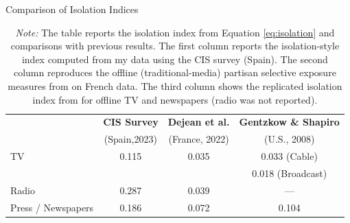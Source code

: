 \documentclass[12pt]{article}
\begin{document}
	
	\begin{table}[H]
		\caption{Comparison of Isolation Indices}
		\label{tab:isolation_table_compare}
		\centering
		\begin{tabular}{lccc}
			\hline
 & \textbf{CIS Survey} & \textbf{Dejean et al.} & \textbf{Gentzkow \& Shapiro} \\
			&  (Spain,2023) & (France, 2022) &  (U.S., 2008) \\
			\hline
			TV & 0.115 & 0.035 & 0.033 \scriptsize{(Cable)}\\
						 &  &  & \hspace{0.45cm} 0.018 \scriptsize{(Broadcast)} \\
			Radio & 0.287 & 0.039 & — \\
			Press / Newspapers & 0.186 & 0.072 & 0.104\\
			\hline
		\end{tabular}
			\caption*{\small  \textit{Note:} The table reports the isolation index from Equation \eqref{eq:isolation} and comparisons with previous results. 
				The first column reports the isolation-style index computed from my data using the CIS survey (Spain).
				The second column reproduces the offline (traditional-media) partisan selective exposure measures from \cite{Dejean2022PartisanSE} on French data. 
				The third column shows the replicated isolation index from \cite{gentzkow_isolation} for offline TV and newspapers (radio was not reported).}
		
	\end{table}
	
\end{document}

